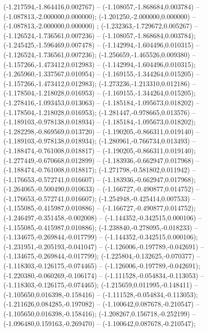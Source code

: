  (-1.217594,-1.864416,0.002767) -- (-1.108057,-1.868684,0.003784) -- (-1.087813,-2.000000,0.000000);
 (-1.201250,-2.000000,0.000000) -- (-1.087813,-2.000000,0.000000) ;
 (-1.232363,-1.729672,0.005267) -- (-1.126524,-1.736561,0.007236) -- (-1.108057,-1.868684,0.003784);
 (-1.245425,-1.596469,0.007478) -- (-1.142994,-1.604496,0.010315) -- (-1.126524,-1.736561,0.007236);
 (-1.256659,-1.465526,0.009380) -- (-1.157266,-1.473412,0.012983) -- (-1.142994,-1.604496,0.010315);
 (-1.265960,-1.337567,0.010954) -- (-1.169155,-1.344264,0.015205) -- (-1.157266,-1.473412,0.012983);
 (-1.273236,-1.213310,0.012186) -- (-1.178504,-1.218028,0.016953) -- (-1.169155,-1.344264,0.015205);
 (-1.278416,-1.093453,0.013063) -- (-1.185184,-1.095673,0.018202) -- (-1.178504,-1.218028,0.016953);
 (-1.281447,-0.978665,0.013576) -- (-1.189103,-0.978138,0.018934) -- (-1.185184,-1.095673,0.018202);
 (-1.282298,-0.869569,0.013720) -- (-1.190205,-0.866311,0.019140) -- (-1.189103,-0.978138,0.018934);
 (-1.280961,-0.766734,0.013493) -- (-1.188474,-0.761008,0.018817) -- (-1.190205,-0.866311,0.019140);
 (-1.277449,-0.670668,0.012899) -- (-1.183936,-0.662947,0.017968) -- (-1.188474,-0.761008,0.018817);
 (-1.271798,-0.581802,0.011942) -- (-1.176653,-0.572741,0.016607) -- (-1.183936,-0.662947,0.017968);
 (-1.264065,-0.500490,0.010633) -- (-1.166727,-0.490877,0.014752) -- (-1.176653,-0.572741,0.016607);
 (-1.254948,-0.425414,0.007533) -- (-1.155085,-0.415987,0.010886) -- (-1.166727,-0.490877,0.014752);
 (-1.246497,-0.351458,-0.002008) -- (-1.144352,-0.342515,0.000106) -- (-1.155085,-0.415987,0.010886);
 (-1.238840,-0.278095,-0.018233) -- (-1.134675,-0.269844,-0.017799) -- (-1.144352,-0.342515,0.000106);
 (-1.231951,-0.205193,-0.041047) -- (-1.126006,-0.197789,-0.042691) -- (-1.134675,-0.269844,-0.017799);
 (-1.225804,-0.132625,-0.070377) -- (-1.118303,-0.126175,-0.074465) -- (-1.126006,-0.197789,-0.042691);
 (-1.220380,-0.060269,-0.106174) -- (-1.111528,-0.054834,-0.113053) -- (-1.118303,-0.126175,-0.074465);
 (-1.215659,0.011995,-0.148411) -- (-1.105650,0.016398,-0.158416) -- (-1.111528,-0.054834,-0.113053);
 (-1.211626,0.084285,-0.197082) -- (-1.100642,0.087678,-0.210547) -- (-1.105650,0.016398,-0.158416);
 (-1.208267,0.156718,-0.252199) -- (-1.096480,0.159163,-0.269470) -- (-1.100642,0.087678,-0.210547);

